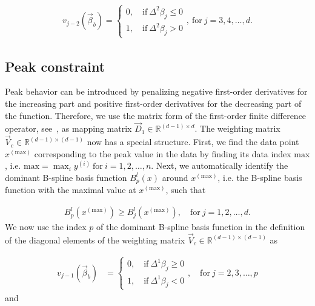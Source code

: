 \begin{align} \label{eq:weighting-matrix-conc-diagonal}
	v_{j-2}(\vec{\beta}_b) = \begin{cases}
		0, \quad \text{if} \ \Delta^2\beta_j \le 0 \\ 
		1, \quad \text{if} \ \Delta^2\beta_j > 0
	\end{cases}, \ \text{for} \ j=3,4, \dots, d.
\end{align}

\subsection{Peak constraint} \label{subsec:PeakC}

Peak behavior can be introduced by penalizing negative first-order derivatives for the increasing part and positive first-order derivatives for the decreasing part of the function. Therefore, we use the matrix form of the first-order finite difference operator, see~, as mapping matrix $\vec{D}_1 \in \mathbb{R}^{(d-1)\times d}$. The weighting matrix $\vec{V}_c \in \mathbb{R}^{(d-1) \times (d-1)}$ now has a special structure. First, we find the data point $x^{(\text{max})}$ corresponding to the peak value in the data by finding its data index $\mathrm{max}$, i.e. $\text{max} = \max_i y^{(i)} \ \text{for} \ i=1,2,\dots, n$. Next, we automatically identify the dominant B-spline basis function $B_p^l(x)$ around $x^{(\text{max})}$, i.e. the B-spline basis function with the maximal value at $x^{(\text{max})}$, such that

\begin{align}
	B_p^l(x^{(\text{max})}) \ge B_j^l(x^{(\text{max})}), \quad \text{for} \ j=1,2,\dots,d.
\end{align} 
%
We now use the index $p$ of the dominant B-spline basis function in the definition of the diagonal elements of the weighting matrix $\vec{V}_c \in \mathbb{R}^{(d-1) \times (d-1)}$ as 

\begin{align}\label{eq:v_peak_1}
	v_{j-1}(\vec{\beta}_b) &= \begin{cases} 
		0, \quad \text{if} \ \Delta^1\beta_j \ge 0 \\ 
		1, \quad \text{if} \ \Delta^1\beta_j  < 0
	\end{cases}, \quad \text{for} \ j=2,3,\dots,p
\end{align}
%
and 

